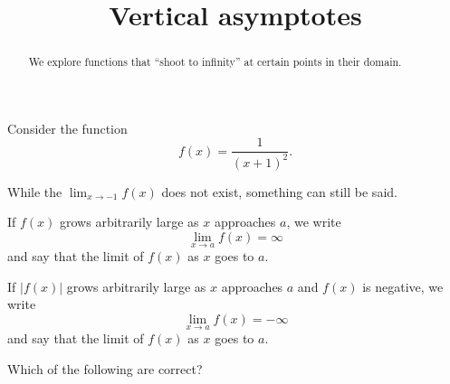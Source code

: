 \documentclass{ximera}
\title[Dig-In:]{Vertical asymptotes}
\begin{document}
\begin{abstract}
We explore functions that ``shoot to infinity'' at certain points in
their domain.
\end{abstract}
\maketitle

Consider the function
\[
f(x) = \frac{1}{(x+1)^2}.
\]
\begin{image}
\end{image}
While the $\lim_{x\to -1} f(x)$ does not exist, something can still be
said.

\begin{definition}\label{def:inflimit}
If $f(x)$ grows arbitrarily large as $x$ approaches $a$, we write
\[
\lim_{x\to a} f(x) = \infty
\]
and say that the limit of $f(x)$  as $x$
goes to $a$.

If $|f(x)|$ grows arbitrarily large as $x$ approaches $a$ and $f(x)$ is
negative, we write
\[
\lim_{x\to a} f(x) = -\infty
\]
and say that the limit of $f(x)$ 
as $x$ goes to $a$.
\end{definition}

\begin{question}
  Which of the following are correct?
  \begin{selectAll}
  \end{selectAll}
\end{question}
\end{document}
